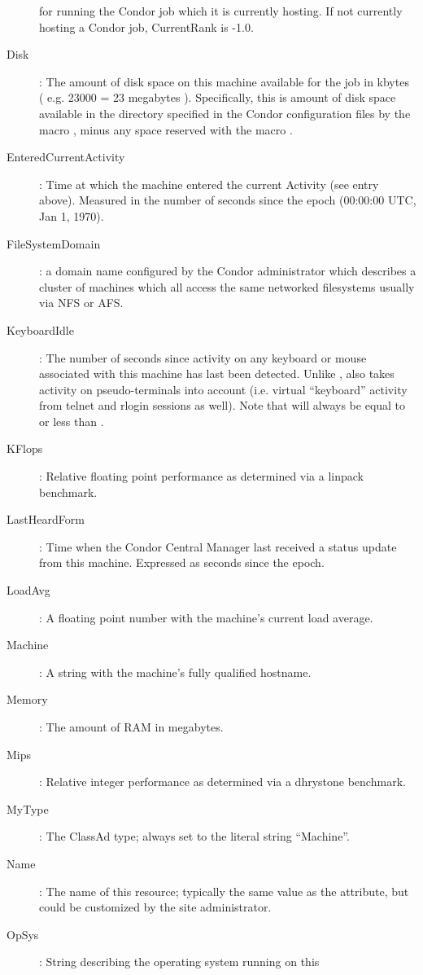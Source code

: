 \begin{description}
for running the Condor job which it is currently hosting.  If not
currently hosting a Condor job, CurrentRank is -1.0.
%
\item[Disk] : The amount of disk space on this machine available for the
job in kbytes ( e.g. 23000 = 23 megabytes ).  Specifically, this is
amount of disk space available in the directory specified in the Condor 
configuration files by the macro , minus any space reserved
with the macro .
%
\item[EnteredCurrentActivity] : Time at which the machine entered the 
current Activity (see  entry above).  Measured in the
number of seconds since the epoch (00:00:00 UTC, Jan 1, 1970).
%
\item[FileSystemDomain] : a domain name configured by the Condor 
administrator which describes a cluster of machines which all access 
the same networked filesystems usually via NFS or AFS.  
%
\item[KeyboardIdle] : The number of seconds since activity on any
keyboard or mouse associated with this machine has last been detected.
Unlike ,  also takes activity 
on pseudo-terminals into
account (i.e. virtual ``keyboard'' activity from telnet and rlogin
sessions as well).  Note that  will always be equal to or
less than .
%
\item[KFlops] : Relative floating point performance as determined via a
linpack benchmark.
%
\item[LastHeardForm] : Time when the Condor Central Manager last
received a status update from this machine.  Expressed as seconds since
the epoch.
%
\item[LoadAvg] : A floating point number with the machine's current load
average.
%
\item[Machine] : A string with the machine's fully qualified hostname.
%
\item[Memory] : The amount of RAM in megabytes.
%
\item[Mips] : Relative integer performance as determined via a dhrystone
benchmark.
%
\item[MyType] : The ClassAd type; always set to the literal string ``Machine''.
%
\item[Name] : The name of this resource; typically the same value as
the  attribute, but could be customized by the site administrator.
%
\item[OpSys] : String describing the operating system running on this

\end{description}
